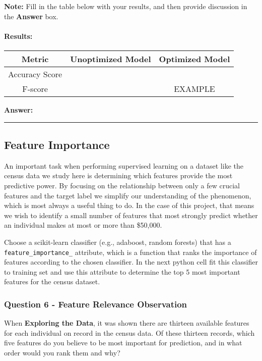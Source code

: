 \documentclass[11pt]{article}
\begin{document}
\textbf{Note:} Fill in the table below with your results, and then
provide discussion in the \textbf{Answer} box.

    \paragraph{Results:}\label{results}

\begin{longtable}[]{@{}ccc@{}}
\toprule
Metric & Unoptimized Model & Optimized Model\tabularnewline
\midrule
\endhead
Accuracy Score & &\tabularnewline
F-score & & EXAMPLE\tabularnewline
\bottomrule
\end{longtable}

    \textbf{Answer: }

    \begin{center}\rule{0.5\linewidth}{\linethickness}\end{center}

\subsection{Feature Importance}\label{feature-importance}

An important task when performing supervised learning on a dataset like
the census data we study here is determining which features provide the
most predictive power. By focusing on the relationship between only a
few crucial features and the target label we simplify our understanding
of the phenomenon, which is most always a useful thing to do. In the
case of this project, that means we wish to identify a small number of
features that most strongly predict whether an individual makes at most
or more than \$50,000.

Choose a scikit-learn classifier (e.g., adaboost, random forests) that
has a \texttt{feature\_importance\_} attribute, which is a function that
ranks the importance of features according to the chosen classifier. In
the next python cell fit this classifier to training set and use this
attribute to determine the top 5 most important features for the census
dataset.

    \subsubsection{Question 6 - Feature Relevance
Observation}\label{question-6---feature-relevance-observation}

When \textbf{Exploring the Data}, it was shown there are thirteen
available features for each individual on record in the census data. Of
these thirteen records, which five features do you believe to be most
important for prediction, and in what order would you rank them and why?
\end{document}
